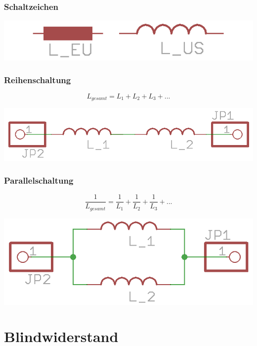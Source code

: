 \begin{frame}
    \frametitle{Schaltzeichen}
    \begin{center}
        \includegraphics[width=1\textwidth]{e06/Spule-schaltZ.png}
    \end{center}
\end{frame}

\begin{frame}
    \frametitle{Reihenschaltung}
    
    $$L_{gesamt} = L_1 + L_2 + L_3 + ...$$

    
    \begin{center}
        \includegraphics[width=1\textwidth]{e06/L_Reihe.png}
    \end{center}
	
\end{frame}

\begin{frame}
    \frametitle{Parallelschaltung}
    $$\frac{1}{L_{gesamt}} = \frac{1}{L_1} + \frac{1}{L_2} + \frac{1}{L_3} + ...$$
    \begin{center}
        \includegraphics[width=1\textwidth]{e06/L_Parallel.png}
    \end{center}
\end{frame}

\section*{Blindwiderstand}

